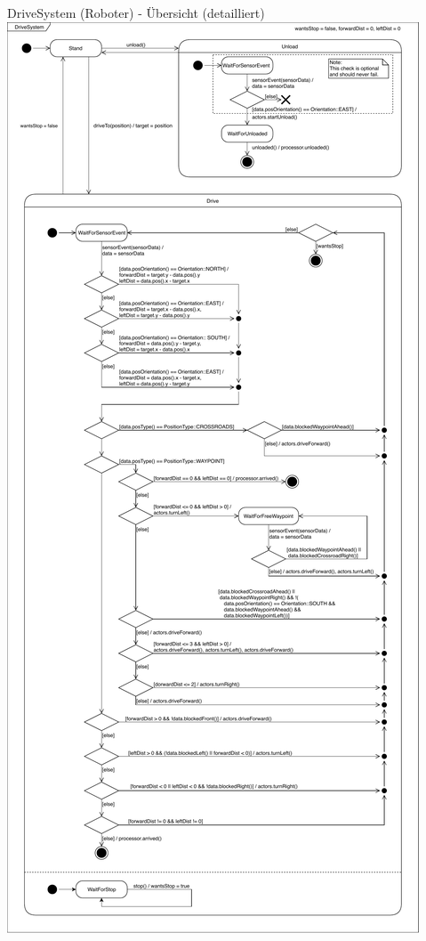 \documentclass{beamer}
\begin{document}
\begin{frame}{DriveSystem (Roboter) - Übersicht (detailliert)}
\centering
\includegraphics[height=0.75\textheight]{PDF/DriveSystem.pdf}
\end{frame}
\end{document}
